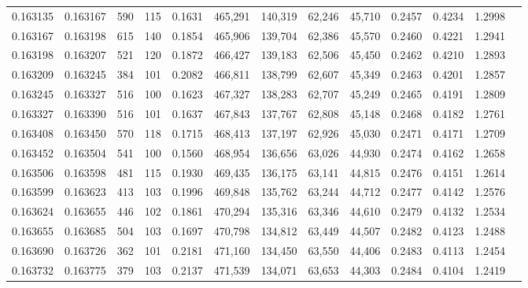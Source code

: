 \begin{tabular}{rrrrrrrrrrrrr}
0.163135 & 0.163167 &   590 & 115 &                                     0.1631 & 465,291 & 140,319 &  62,246 &  45,710 & 0.2457 & 0.4234 & 1.2998 \\
0.163167 & 0.163198 &   615 & 140 &                                     0.1854 & 465,906 & 139,704 &  62,386 &  45,570 & 0.2460 & 0.4221 & 1.2941 \\
0.163198 & 0.163207 &   521 & 120 &                                     0.1872 & 466,427 & 139,183 &  62,506 &  45,450 & 0.2462 & 0.4210 & 1.2893 \\
0.163209 & 0.163245 &   384 & 101 &                                     0.2082 & 466,811 & 138,799 &  62,607 &  45,349 & 0.2463 & 0.4201 & 1.2857 \\
0.163245 & 0.163327 &   516 & 100 &                                     0.1623 & 467,327 & 138,283 &  62,707 &  45,249 & 0.2465 & 0.4191 & 1.2809 \\
0.163327 & 0.163390 &   516 & 101 &                                     0.1637 & 467,843 & 137,767 &  62,808 &  45,148 & 0.2468 & 0.4182 & 1.2761 \\
0.163408 & 0.163450 &   570 & 118 &                                     0.1715 & 468,413 & 137,197 &  62,926 &  45,030 & 0.2471 & 0.4171 & 1.2709 \\
0.163452 & 0.163504 &   541 & 100 &                                     0.1560 & 468,954 & 136,656 &  63,026 &  44,930 & 0.2474 & 0.4162 & 1.2658 \\
0.163506 & 0.163598 &   481 & 115 &                                     0.1930 & 469,435 & 136,175 &  63,141 &  44,815 & 0.2476 & 0.4151 & 1.2614 \\
0.163599 & 0.163623 &   413 & 103 &                                     0.1996 & 469,848 & 135,762 &  63,244 &  44,712 & 0.2477 & 0.4142 & 1.2576 \\
0.163624 & 0.163655 &   446 & 102 &                                     0.1861 & 470,294 & 135,316 &  63,346 &  44,610 & 0.2479 & 0.4132 & 1.2534 \\
0.163655 & 0.163685 &   504 & 103 &                                     0.1697 & 470,798 & 134,812 &  63,449 &  44,507 & 0.2482 & 0.4123 & 1.2488 \\
0.163690 & 0.163726 &   362 & 101 &                                     0.2181 & 471,160 & 134,450 &  63,550 &  44,406 & 0.2483 & 0.4113 & 1.2454 \\
0.163732 & 0.163775 &   379 & 103 &                                     0.2137 & 471,539 & 134,071 &  63,653 &  44,303 & 0.2484 & 0.4104 & 1.2419 \\

\end{tabular}
